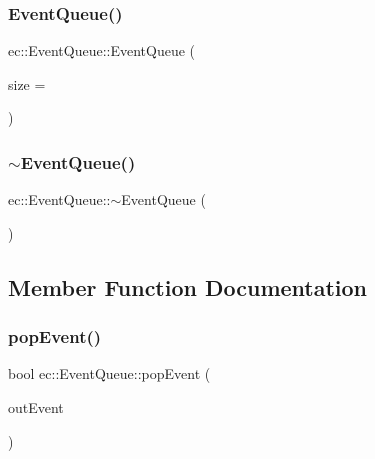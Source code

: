 \subsubsection{\texorpdfstring{Event\+Queue()}{EventQueue()}}
{\footnotesize\ttfamily ec\+::\+Event\+Queue\+::\+Event\+Queue (\begin{DoxyParamCaption}\item[{unsigned int}]{size = {} }\end{DoxyParamCaption})\hspace{0.3cm}{\ttfamily [explicit]}}

\mbox{\label{classec_1_1_event_queue_a98fb5b9cf781f87dee6443831dc42e65}} 
\subsubsection{\texorpdfstring{$\sim$\+Event\+Queue()}{~EventQueue()}}
{\footnotesize\ttfamily ec\+::\+Event\+Queue\+::$\sim$\+Event\+Queue (\begin{DoxyParamCaption}{ }\end{DoxyParamCaption})\hspace{0.3cm}{\ttfamily [default]}}



\subsection{Member Function Documentation}
\mbox{\label{classec_1_1_event_queue_a58cdf15f7320b9eb70fd5937a68f3656}} 
\subsubsection{\texorpdfstring{pop\+Event()}{popEvent()}}
{\footnotesize\ttfamily bool ec\+::\+Event\+Queue\+::pop\+Event (\begin{DoxyParamCaption}\item[{\mbox{\hyperlink{structec_1_1_input_event}{Input\+Event}} \&}]{out\+Event }\end{DoxyParamCaption})}

